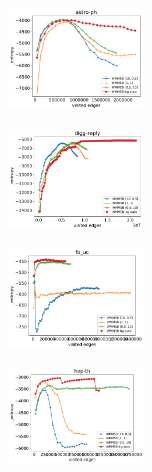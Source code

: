 
\begin{subfigure}
     \centering
         \includegraphics[width=0.32\textwidth]{fig/astro-ph_fig__entropy}
\end{subfigure}
\begin{subfigure}
         \centering
      \includegraphics[width=0.32\textwidth]{fig/digg-reply_fig__entropy}               
\end{subfigure}                                                                          
\begin{subfigure}                                                                        
         \centering                                                                      
      \includegraphics[width=0.32\textwidth]{fig/fb_uc_fig__entropy}
\end{subfigure}                                                                          
\begin{subfigure}                                                                        
         \centering                                                                      
      \includegraphics[width=0.32\textwidth]{fig/hep-th_fig__entropy}
\end{subfigure}                                                                          

